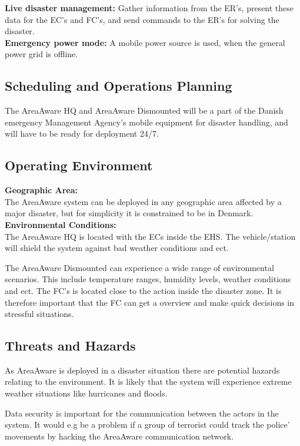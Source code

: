 \noindent \textbf{Live disaster management:} Gather information from the ER's, present these data for the EC's and FC's, and send commands to the ER's for solving the disaster.\\

\noindent \textbf{Emergency power mode:} A mobile power source is used, when the general power grid is offline.

\subsection{Scheduling and Operations Planning}
The AreaAware HQ and AreaAware Dismounted will be a part of the Danish emergency Management Agency’s mobile equipment for disaster handling, and will have to be ready for deployment 24/7.

\subsection{Operating Environment}
\noindent \textbf{Geographic Area:}\\
The AreaAware system can be deployed in any geographic area affected by a major disaster, but for simplicity it is constrained to be in Denmark. \\

\noindent \textbf{Environmental Conditions:}\\
The AreaAware HQ is located with the ECs inside the EHS. The vehicle/station will shield the system against bad weather conditions and ect.

The AreaAware Dismounted can experience a wide range of environmental scenarios. This include temperature ranges, humidity levels, weather conditions and ect. The FC's is located close to the action inside the disaster zone. It is therefore important that the FC can get a overview and make quick decisions in stressful situations.

\subsection{Threats and Hazards}
As AreaAware is deployed in a disaster situation there are potential hazards relating to the environment. It is likely that the system will experience extreme weather situations like hurricanes and floods.

Data security is important for the communication between the actors in the system. It would e.g be a problem if a group of terrorist could track the police’ movements by hacking the AreaAware communication network.

